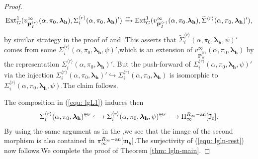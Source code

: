 \documentclass[SecEq,CM,GP]{degruyter-crelle} %
\theoremstyle{plain}
\newcommand{\hooklongrightarrow}{\lhook\joinrel\longrightarrow}
\newcommand{\ana}{{\rm an}}
\newcommand{\ext}{{\rm Ext}}
\newcommand{\lrr}{{\langle r\rangle}}
\newcommand{\lra}{\longrightarrow}
\newcommand{\op}{{\overline{{\mathbf{P}}}}}
\newcommand{\bh}{{\mathbf{h}}}
\newcommand{\FI}{{\mathfrak{I}}}
\newcommand{\fm}{{\mathfrak{m}}}
\begin{document}
\begin{proof}
\begin{equation*}
	\ext^1_G(v_{\op^{\lrr}_I}^{\infty}(\alpha,\pi_0,{\bm\lambda}_\bh), \Sigma_i^{\lrr}(\alpha,\pi_0, {\bm\lambda}_\bh)') \xrightarrow{\sim}  \ext^1_G(v_{\op^{\lrr}_I}^{\infty}(\alpha,\pi_0.{\bm\lambda}_\bh), \widetilde{\Sigma}^{\lrr}(\alpha,\pi_0, {\bm\lambda}_\bh)'),
\end{equation*}
by similar strategy in the proof of \cite[Proposition 5.29]{2022ext1hyq} and \cite[Proposition 5.34(2)]{2022ext1hyq}.\;This asserts that
$\widetilde{\Sigma}_i^{\lrr}(\alpha,\pi_0,{\bm\lambda}_\bh, \psi)'$ comes from some $\Sigma_i^{\lrr}(\alpha,\pi_0,{\bm\lambda}_\bh, \psi)'$,\;which is
an extension of $v_{\op^{\lrr}_{ir}}^{\infty}(\alpha,\pi_0, {\bm\lambda}_\bh)$ by the representation $\Sigma_i^{\lrr}(\alpha,\pi_0,{\bm\lambda}_\bh)'$. But the push-forward of $\Sigma_i^{\lrr}(\alpha,\pi_0, {\bm\lambda}_\bh, \psi)'$ via the injection $\Sigma_i^{\lrr}(\alpha,\pi_0,{\bm\lambda}_\bh)'\hookrightarrow \Sigma_i^{\lrr}(\alpha,\pi_0,{\bm\lambda}_\bh)$ is isomorphic to $\Sigma_i^{\lrr}(\alpha,\pi_0,{\bm\lambda}_\bh, \psi)$.\;The claim follows.\;

The composition in (\ref{equ: lgL1}) induces then
\begin{equation*}
	\Sigma_i^{\lrr}(\alpha,\pi_0, {\bm\lambda}_\bh)^{\oplus r}\hooklongrightarrow \Sigma_i^{\lrr}(\alpha,\pi_0,{\bm\lambda}_\bh, \psi)^{\oplus r} \lra \Pi_{\infty}^{R_{\infty}-\ana}[\FI_t].
\end{equation*}
By using the same argument as in the \cite[Page.]{2015Ding},\;we see that the image of the second morphism is also contained in $ \pi_{\infty}^{R_{\infty}-\ana}[\fm_y] $.\;The surjectivity of (\ref{equ: lgln-rest}) now follows.\;We complete the proof of Theorem \ref{thm: lgln-main}.
\end{proof}



\end{document}
